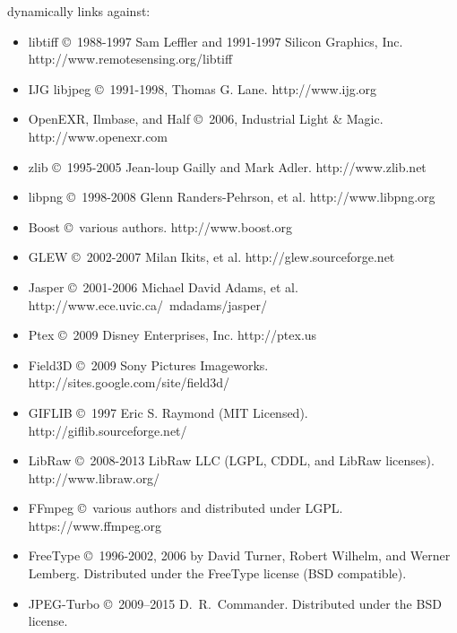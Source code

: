 \noindent \product dynamically links against:
\begin{itemize}
\item {\cf libtiff} \copyright\ 1988-1997 Sam Leffler and 1991-1997 Silicon
Graphics, Inc. \\ {\cf http://www.remotesensing.org/libtiff}
\item {\cf IJG libjpeg} \copyright\ 1991-1998, Thomas G. Lane.  {\cf http://www.ijg.org}
\item OpenEXR, Ilmbase, and Half \copyright\ 2006, Industrial Light \& Magic.\\
{\cf http://www.openexr.com}
\item {\cf zlib} \copyright\ 1995-2005 Jean-loup Gailly and Mark Adler. 
{\cf http://www.zlib.net}
\item {\cf libpng} \copyright\ 1998-2008 Glenn Randers-Pehrson, et al.  
{\cf http://www.libpng.org}
\item Boost \copyright\ various authors. {\cf http://www.boost.org}
\item GLEW \copyright\ 2002-2007 Milan Ikits, et al. 
{\cf http://glew.sourceforge.net}
\item Jasper \copyright\ 2001-2006 Michael David Adams, et al. \\
{\cf http://www.ece.uvic.ca/~mdadams/jasper/}
\item Ptex \copyright\ 2009 Disney Enterprises, Inc.
{\cf http://ptex.us}
\item Field3D \copyright\ 2009 Sony Pictures Imageworks.
{\cf http://sites.google.com/site/field3d/}
\item {\cf GIFLIB} \copyright\ 1997 Eric S. Raymond (MIT Licensed).
{\cf http://giflib.sourceforge.net/}
\item {\cf LibRaw} \copyright\ 2008-2013 LibRaw LLC (LGPL, CDDL, and LibRaw
    licenses). \\ {\cf http://www.libraw.org/}
\item {\cf FFmpeg} \copyright\ various authors and distributed under LGPL.
   {\cf https://www.ffmpeg.org}
\item {\cf FreeType} \copyright\ 1996-2002, 2006 by David Turner, Robert
    Wilhelm, and Werner Lemberg. Distributed under the FreeType license (BSD compatible).
\item {\cf JPEG-Turbo} \copyright\ 2009--2015 D.\ R.\ Commander. Distributed
    under the BSD license.

\end{itemize}



\chapwidthend
